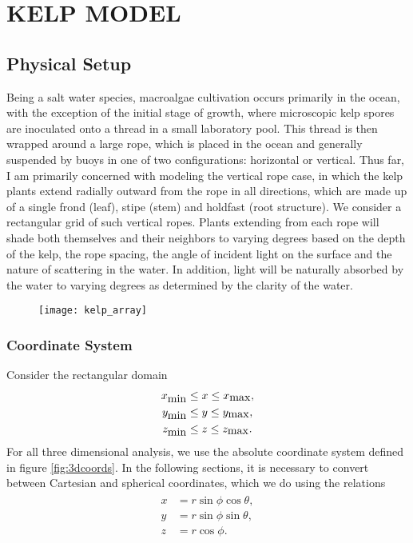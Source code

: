 \chapter{KELP MODEL}
\label{label:kelp}

\section{Physical Setup}
Being a salt water species, macroalgae cultivation occurs primarily in the ocean, with the exception of the initial stage of growth, where microscopic kelp spores are inoculated onto a thread in a small laboratory pool.
This thread is then wrapped around a large rope, which is placed in the ocean and generally suspended by buoys in one of two configurations: horizontal or vertical.
Thus far, I am primarily concerned with modeling the vertical rope case, in which the kelp plants extend radially outward from the rope in all directions, which are made up of a single frond (leaf), stipe (stem) and holdfast (root structure).
We consider a rectangular grid of such vertical ropes. 
Plants extending from each rope will shade both themselves and their neighbors
to varying degrees based on the depth of the kelp, the rope spacing, the angle
of incident light on the surface and the nature of scattering in the water.
In addition, light will be naturally absorbed by the water to varying degrees as determined by the clarity of the water.

\begin{figure}[H]
	\centering
	\texttt{[image: kelp\_array]}
\end{figure}
\subsection{Coordinate System}

Consider the rectangular domain
\begin{align*}
  x_{\mbox{min}} &\leq x \leq x_{\mbox{max}}, \\
  y_{\mbox{min}} &\leq y \leq y_{\mbox{max}}, \\
  z_{\mbox{min}} &\leq z \leq z_{\mbox{max}}.
\end{align*}
For all three dimensional analysis, we use the absolute coordinate system defined in figure \ref{fig:3dcoords}.
In the following sections, it is necessary to convert between Cartesian and spherical coordinates, which we do using the relations
\begin{align}
	\begin{split}
		x & = r\sin\phi\cos\theta, \\
		y & = r\sin\phi\sin\theta, \\
		z & = r\cos\phi. \\
	\label{eqn:coords}
	\end{split}
\end{align}

